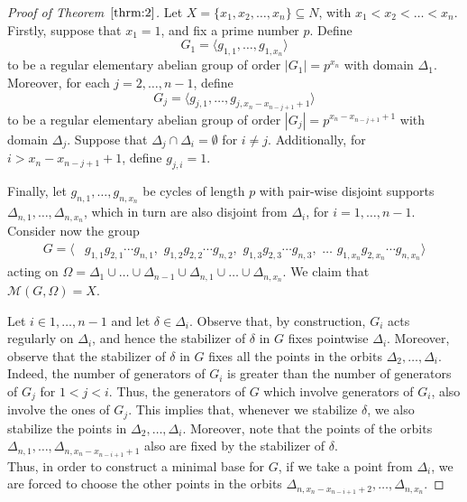 \documentclass{amsart}
\begin{document}
	
\begin{proof}[Proof of Theorem~$\ref{thrm:2}$]Let $X = \{x_1,x_2,\dots,x_n\}\subseteq N$, with $x_1 < x_2 < \dots < x_n$. \\
	Firstly, suppose that $x_1=1$, and fix a prime number $p$. Define 
	\[
		G_1 = \langle g_{1,1},\dots,g_{1,x_n} \rangle
	\]
	to be a regular elementary abelian group of order $|G_1| = p^{x_n}$ with domain $\Delta_1$. 
	Moreover, for each $j=2,\dots,n-1$, define
	\[
		G_j = \langle 	g_{j,1},\dots,g_{j,x_n-x_{n-j+1}+1} \rangle
	\]
	to be a regular elementary abelian group of order $ |G_j| = p^{x_n-x_{n-j+1}+1}$ with domain $\Delta_j$. Suppose that $\Delta_j \cap \Delta_i = \emptyset$ for $i \neq j$. 
	Additionally, for $i> x_n-x_{n-j+1}+1$, define $g_{j,i}=1$.
	

	Finally, let $g_{n,1},\dots, g_{n,x_n}$ be cycles of length $p$ with pair-wise disjoint supports $\Delta_{n,1}, \dots, \Delta_{n,x_n}$, which in turn are also disjoint from $\Delta_i$, for $i=1,\dots,n-1$.
	\\
	Consider now the group
	\begin{align*}
		G = \langle &g_{1,1} g_{2,1} \cdots g_{n,1},\,\,g_{1,2} g_{2,2} \cdots g_{n,2},\,\, g_{1,3} g_{2,3} \cdots g_{n,3},\,\, \dots\,\, g_{1,x_n}g_{2,x_n} \cdots g_{n,x_n} \rangle
	\end{align*}
	acting on $\Omega=\Delta_1 \cup \dots \cup \Delta_{n-1} \cup \Delta_{n,1} \cup \dots \cup \Delta_{n,x_n}$.
	We claim that $\mathcal{M}(G,\Omega) = X$.
	
	
	Let $i \in {1,\dots,n-1}$ and let $\delta \in \Delta_i$. Observe that, by construction, $G_i$ acts regularly on $\Delta_i$, and hence the stabilizer of $\delta$ in $G$ fixes pointwise $\Delta_i$. Moreover, observe that the stabilizer of $\delta$ in $G$ fixes all the points in the orbits $\Delta_{2},\dots, \Delta_{i}$. Indeed, the number of generators of $G_i$ is greater than the number of generators of $G_j$ for $1< j<i$. Thus, the generators of $G$ which involve generators of $G_i$, also involve the ones of $G_j$. This implies that,  whenever we stabilize $\delta$, we also stabilize the points in $\Delta_2,\dots, \Delta_{i}$. Moreover, note that the points of the orbits $\Delta_{n,1},\dots,\Delta_{n,x_n-x_{n-i+1}+1}$ also are fixed by the stabilizer of $\delta$.
	\\
	Thus, in order to construct a minimal base for $G$, if we take a point from $\Delta_i$, we are forced to choose the other points in the orbits $\Delta_{n,x_n-x_{n-i+1}+2},\dots,\Delta_{n,x_n}$.
	

\end{proof}
\end{document}

